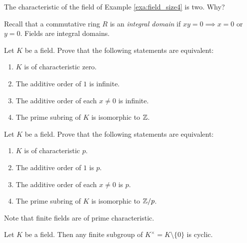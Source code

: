 \begin{example}
    The characteristic of the field of Example \ref{exa:field_size4}
    is two. Why?
\end{example}

Recall that a commutative ring $R$ is an \emph{integral 
domain} if $xy=0\implies x=0$ or $y=0$. Fields
are integral domains. 

\begin{exercise}
\label{xca: char 0}
	Let $K$ be a field. Prove that
	the following statements are equivalent:
	\begin{enumerate}
		\item $K$ is of characteristic zero.
		\item The additive order of $1$ is infinite. 
		\item The additive order of each $x\ne0$ is infinite.
		\item The prime subring of $K$ is isomorphic to $\mathbb{Z}$.
	\end{enumerate}
\end{exercise}

\begin{exercise}
\label{xca: char p}
	Let $K$ be a field. Prove that
	the following statements are equivalent:
	\begin{enumerate}
		\item $K$ is of characteristic $p$.
		\item The additive order of $1$ is $p$. 
		\item The additive order of each $x\ne0$ is $p$.
		\item The prime subring of $K$ is isomorphic to $\mathbb{Z}/p$.
	\end{enumerate}
\end{exercise}



Note that finite fields are of prime characteristic. 

\begin{proposition}
\label{pro:cyclic}
    Let $K$ be a field. Then any finite subgroup of  $K^\times=K\setminus\{0\}$ is cyclic. 
\end{proposition}

